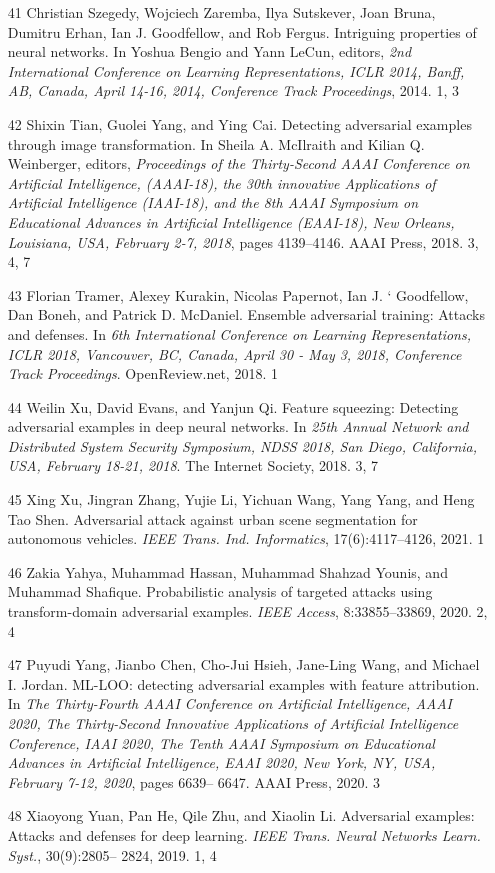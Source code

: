 \documentclass{article}
\begin{document}
\begin{itemize}
\item 
[41] Christian Szegedy, Wojciech Zaremba, Ilya Sutskever, Joan Bruna, Dumitru Erhan, Ian J. Goodfellow, and Rob Fergus. Intriguing properties of neural networks. In Yoshua Bengio and Yann LeCun, editors, \textit{2nd International Conference on Learning Representations, ICLR 2014, Banff, AB, Canada, April 14-16, 2014, Conference Track Proceedings}, 2014. 1, 3

\item 
[42] Shixin Tian, Guolei Yang, and Ying Cai. Detecting adversarial examples through image transformation. In Sheila A. McIlraith and Kilian Q. Weinberger, editors, \textit{Proceedings of the Thirty-Second AAAI Conference on Artificial Intelligence, (AAAI-18), the 30th innovative Applications of Artificial Intelligence (IAAI-18), and the 8th AAAI Symposium on Educational Advances in Artificial Intelligence (EAAI-18), New Orleans, Louisiana, USA, February 2-7, 2018}, pages 4139–4146. AAAI Press, 2018. 3, 4, 7

\item 
[43] Florian Tramer, Alexey Kurakin, Nicolas Papernot, Ian J. ` Goodfellow, Dan Boneh, and Patrick D. McDaniel. Ensemble adversarial training: Attacks and defenses. In \textit{6th International Conference on Learning Representations, ICLR 2018, Vancouver, BC, Canada, April 30 - May 3, 2018, Conference Track Proceedings}. OpenReview.net, 2018. 1

\item 
[44] Weilin Xu, David Evans, and Yanjun Qi. Feature squeezing: Detecting adversarial examples in deep neural networks. In \textit{25th Annual Network and Distributed System Security Symposium, NDSS 2018, San Diego, California, USA, February 18-21, 2018}. The Internet Society, 2018. 3, 7

\item 
[45] Xing Xu, Jingran Zhang, Yujie Li, Yichuan Wang, Yang Yang, and Heng Tao Shen. Adversarial attack against urban scene segmentation for autonomous vehicles. \textit{IEEE Trans. Ind. Informatics}, 17(6):4117–4126, 2021. 1

\item 
[46] Zakia Yahya, Muhammad Hassan, Muhammad Shahzad Younis, and Muhammad Shafique. Probabilistic analysis of targeted attacks using transform-domain adversarial examples. \textit{IEEE Access}, 8:33855–33869, 2020. 2, 4

\item 
[47] Puyudi Yang, Jianbo Chen, Cho-Jui Hsieh, Jane-Ling Wang, and Michael I. Jordan. ML-LOO: detecting adversarial examples with feature attribution. In \textit{The Thirty-Fourth AAAI Conference on Artificial Intelligence, AAAI 2020, The Thirty-Second Innovative Applications of Artificial Intelligence Conference, IAAI 2020, The Tenth AAAI Symposium on Educational Advances in Artificial Intelligence, EAAI 2020, New York, NY, USA, February 7-12, 2020}, pages 6639– 6647. AAAI Press, 2020. 3

\item 
[48] Xiaoyong Yuan, Pan He, Qile Zhu, and Xiaolin Li. Adversarial examples: Attacks and defenses for deep learning. \textit{IEEE Trans. Neural Networks Learn. Syst.}, 30(9):2805– 2824, 2019. 1, 4

\end{itemize}
\end{document}
